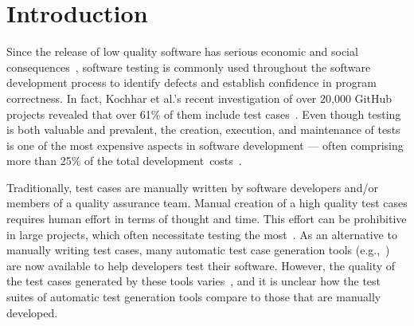 
\section{Introduction}


Since the release of low quality software has serious economic and social consequences~\cite{tassey2002}, software testing is commonly used throughout the software development process to identify defects and establish confidence in program correctness. In fact, Kochhar et al.'s recent investigation of over 20,000 GitHub projects revealed that over 61\% of them include test cases~\cite{kochhar2013}.  Even though testing is both valuable and prevalent, the creation, execution, and maintenance of tests is one of the most expensive aspects in software development --- often comprising more than 25\% of the total \mbox{development costs~\cite{vizard2013}.}


Traditionally, test cases are manually written by software developers and/or members of a quality assurance team.  Manual creation of a high quality test cases requires human effort in terms of thought and time.  This effort can be prohibitive in large projects, which often necessitate testing the most~\cite{kochhar2013}.  As an alternative to manually writing test cases, many automatic test case generation tools (e.g.,~\cite{fraser:2011:eat:2025113.2025179,pacheco2007feedback,csallner2004}) are now available to help developers test their software.  However, the quality of the test cases generated by these tools varies~\cite{bacchelli2008,fraser2013c,fraser2013a}, and it is unclear how the test suites of automatic test generation tools compare to those that are manually developed.

